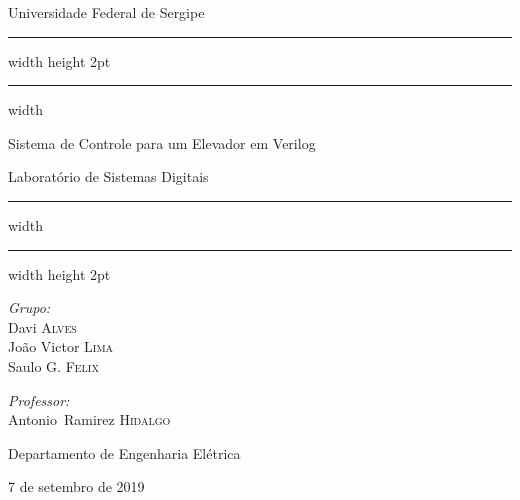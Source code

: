 \begin{titlepage}
  \begin{center}
    \vspace*{1cm}

    \Huge
    Universidade Federal de Sergipe\\
    \vfill

    \hrule width \hsize height 2pt \kern 0.2mm \hrule width \hsize

    \vspace{6pt}
    \LARGE Sistema de Controle para um Elevador em Verilog
    \vspace{0.5cm}

    \Large
    Laboratório de Sistemas Digitais
    \vspace{6pt}

    \hrule width \hsize \kern 0.2mm \hrule width \hsize height 2pt

    \vfill
    \vspace{1.5cm}

    \begin{minipage}{0.3\textwidth}
      \begin{flushleft}
        \large
        \emph{Grupo:}\\
        Davi \textsc{Alves}\\
        João Victor \textsc{Lima}\\
        Saulo G. \textsc{Felix}
      \end{flushleft}
    \end{minipage}
    \hspace{\fill}
    \begin{minipage}{0.45\textwidth}
      \begin{flushright}
      \large
      \emph{Professor:} \\
      Antonio\ Ramirez \textsc{Hidalgo}\\
      \vspace{1.5cm}
      \end{flushright}
    \end{minipage}

    \vfill
    \large
    Departamento de Engenharia Elétrica\\
    \vfill

    \large
    7 de setembro de 2019

  \end{center}
\end{titlepage}
